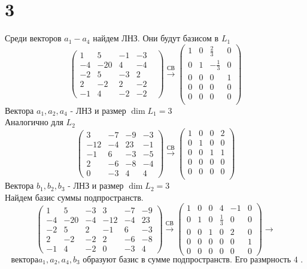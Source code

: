 	\section*{3}
	Среди векторов 	$a_1-a_4$ найдем ЛНЗ. Они будут базисом в $L_1$ \\
	$$\begin{pmatrix}
		1 & 5 & -1 & -3 & \\
		-4 & -20 & 4 & -4 \\
		-2 & 5 & -3 & 2 \\
		2 & -2 & 2 & -2 \\
		-1 & 4 & -2 & -2 
	\end{pmatrix}\xrightarrow{\text{СВ}} 
	\begin{pmatrix}
		1 & 0 & \frac23 & 0 \\
		0 & 1 & -\frac13 & 0 \\
		0 & 0 & 0 & 1 \\
		0 & 0 & 0 & 0\\
		0 & 0 & 0 & 0\\
	\end{pmatrix}$$
	Вектора $a_1, a_2, a_4 $ - ЛНЗ и размер $\dim L_1 = 3$ \\
	Аналогично для $L_2$ \\
	$$\begin{pmatrix}
		3 & -7 & -9 & -3 \\
		-12 & -4 & 23 & -1 \\
		-1 & 6 & -3 & -5 \\
		2 & -6 & -8 & -4 \\
		0 & -3 & 4 & 4 
	\end{pmatrix}\xrightarrow{\text{СВ}}  
	\begin{pmatrix}
		1 & 0 & 0 & 2 \\
		0 & 1 & 0 & 0 \\
		0 & 0 & 1 & 1 \\
		0 & 0 & 0 & 0\\
		0 & 0 & 0 & 0\\
	\end{pmatrix}$$
	Вектора $b_1, b_2, b_3 $ - ЛНЗ и размер $\dim L_2 = 3$\\
	Найдем базис суммы подпространств. 
	$$\begin{pmatrix}
		1 & 5 & -3 & 3 & -7 & -9 \\
		-4 & -20 & -4 & -12 & -4 & 23 \\
		-2 & 5 & 2 & -1 & 6 & -3 \\
		2 & -2 & -2 & 2 & -6 & -8 \\
		-1 & 4 & -2 & 0 & -3 & 4 
	\end{pmatrix}\xrightarrow{\text{СВ}}  \begin{pmatrix}
	1 & 0 & 0 & 4 & -1 & 0 \\
	0 & 1 & 0 & \frac13 & 0 & 0 \\
	0 & 0 & 1 & 0 & 2 & 0 \\
	0 & 0 & 0 & 0 & 0 & 1 \\
	0 & 0 & 0 & 0 & 0 & 0
	\end{pmatrix}\to$$ $$ \text{ вектора} a_1,a_2,a_4 ,b_3 \text{ образуют базис в сумме подпространств. Его размрность 4 .}  $$


